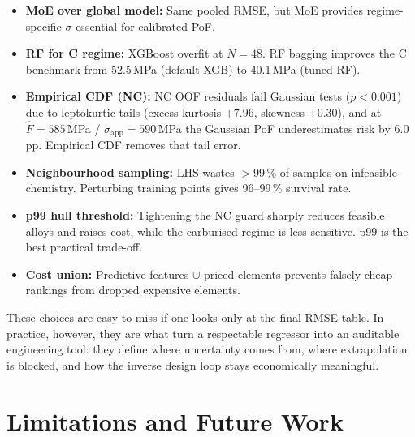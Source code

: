 \documentclass[12pt,a4paper]{article} %
\begin{document}
\begin{itemize}
  \item \textbf{MoE over global model:} Same pooled RMSE, but MoE provides regime-specific $\sigma$ essential for calibrated PoF.
  \item \textbf{RF for C regime:} XGBoost overfit at $N=48$. RF bagging improves the C benchmark from 52.5\,MPa (default XGB) to 40.1\,MPa (tuned RF).
  \item \textbf{Empirical CDF (NC):} NC OOF residuals fail Gaussian tests ($p<0.001$) due to leptokurtic tails (excess kurtosis $+7.96$, skewness $+0.30$), and at $\hat{F}=585$\,MPa / $\sigma_{\text{app}}=590$\,MPa the Gaussian PoF underestimates risk by 6.0\,pp. Empirical CDF removes that tail error.
  \item \textbf{Neighbourhood sampling:} LHS wastes $>$99\,\% of samples on infeasible chemistry. Perturbing training points gives 96--99\,\% survival rate.
  \item \textbf{p99 hull threshold:} Tightening the NC guard sharply reduces feasible alloys and raises cost, while the carburised regime is less sensitive. p99 is the best practical trade-off.
  \item \textbf{Cost union:} Predictive features $\cup$ priced elements prevents falsely cheap rankings from dropped expensive elements.
\end{itemize}
These choices are easy to miss if one looks only at the final RMSE table. In practice,
however, they are what turn a respectable regressor into an auditable engineering tool:
they define where uncertainty comes from, where extrapolation is blocked, and how the
inverse design loop stays economically meaningful.

\section{Limitations and Future Work}
\end{document}

